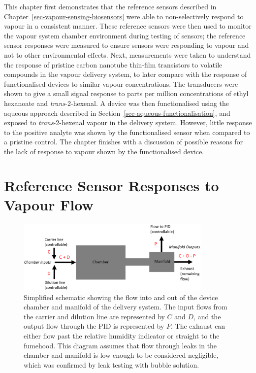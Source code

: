 \documentclass[
  a4paper,
]{scrbook}
\begin{document}
This chapter first demonstrates that the reference sensors described in
Chapter~\ref{sec-vapour-sensing-biosensors} were able to non-selectively
respond to vapour in a consistent manner. These reference sensors were
then used to monitor the vapour system chamber environment during
testing of sensors; the reference sensor responses were measured to
ensure sensors were responding to vapour and not to other environmental
effects. Next, measurements were taken to understand the response of
pristine carbon nanotube thin-film transistors to volatile compounds in
the vapour delivery system, to later compare with the response of
functionalised devices to similar vapour concentrations. The transducers
were shown to give a small signal response to parts per million
concentrations of ethyl hexanoate and \emph{trans}-2-hexenal. A device
was then functionalised using the aqueous approach described in
Section~\ref{sec-aqueous-functionalisation}, and exposed to
\emph{trans}-2-hexenal vapour in the delivery system. However, little
response to the positive analyte was shown by the functionalised sensor
when compared to a pristine control. The chapter finishes with a
discussion of possible reasons for the lack of response to vapour shown
by the functionalised device.

\hypertarget{sec-responses-to-vapour}{%
\section{Reference Sensor Responses to Vapour
Flow}\label{sec-responses-to-vapour}}

\begin{figure}

{\centering \includegraphics[width=0.85\textwidth,height=\textheight]{figures/ch9/chamber-manifold-v2.png}

}

\caption[Simplified schematic showing the flow into and out of the
device chamber and manifold of the delivery
system.]{\label{fig-chamber-schematic}Simplified schematic showing the
flow into and out of the device chamber and manifold of the delivery
system. The input flows from the carrier and dilution line are
represented by \(C\) and \(D\), and the output flow through the PID is
represented by \(P\). The exhaust can either flow past the relative
humidity indicator or straight to the fumehood. This diagram assumes
that flow through leaks in the chamber and manifold is low enough to be
considered negligible, which was confirmed by leak testing with bubble
solution.}

\end{figure}
\end{document}
